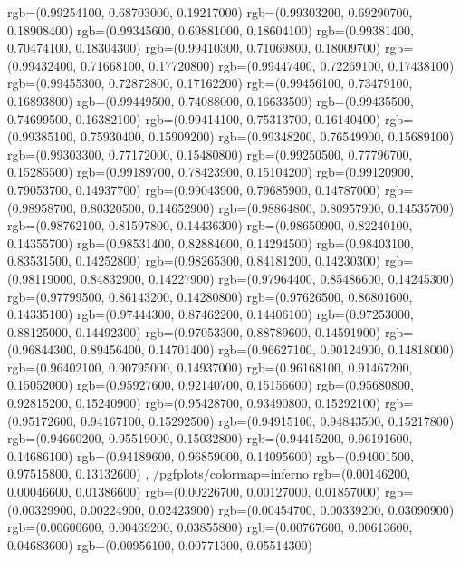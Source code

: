 {{        rgb=(0.99254100, 0.68703000, 0.19217000)
        rgb=(0.99303200, 0.69290700, 0.18908400)
        rgb=(0.99345600, 0.69881000, 0.18604100)
        rgb=(0.99381400, 0.70474100, 0.18304300)
        rgb=(0.99410300, 0.71069800, 0.18009700)
        rgb=(0.99432400, 0.71668100, 0.17720800)
        rgb=(0.99447400, 0.72269100, 0.17438100)
        rgb=(0.99455300, 0.72872800, 0.17162200)
        rgb=(0.99456100, 0.73479100, 0.16893800)
        rgb=(0.99449500, 0.74088000, 0.16633500)
        rgb=(0.99435500, 0.74699500, 0.16382100)
        rgb=(0.99414100, 0.75313700, 0.16140400)
        rgb=(0.99385100, 0.75930400, 0.15909200)
        rgb=(0.99348200, 0.76549900, 0.15689100)
        rgb=(0.99303300, 0.77172000, 0.15480800)
        rgb=(0.99250500, 0.77796700, 0.15285500)
        rgb=(0.99189700, 0.78423900, 0.15104200)
        rgb=(0.99120900, 0.79053700, 0.14937700)
        rgb=(0.99043900, 0.79685900, 0.14787000)
        rgb=(0.98958700, 0.80320500, 0.14652900)
        rgb=(0.98864800, 0.80957900, 0.14535700)
        rgb=(0.98762100, 0.81597800, 0.14436300)
        rgb=(0.98650900, 0.82240100, 0.14355700)
        rgb=(0.98531400, 0.82884600, 0.14294500)
        rgb=(0.98403100, 0.83531500, 0.14252800)
        rgb=(0.98265300, 0.84181200, 0.14230300)
        rgb=(0.98119000, 0.84832900, 0.14227900)
        rgb=(0.97964400, 0.85486600, 0.14245300)
        rgb=(0.97799500, 0.86143200, 0.14280800)
        rgb=(0.97626500, 0.86801600, 0.14335100)
        rgb=(0.97444300, 0.87462200, 0.14406100)
        rgb=(0.97253000, 0.88125000, 0.14492300)
        rgb=(0.97053300, 0.88789600, 0.14591900)
        rgb=(0.96844300, 0.89456400, 0.14701400)
        rgb=(0.96627100, 0.90124900, 0.14818000)
        rgb=(0.96402100, 0.90795000, 0.14937000)
        rgb=(0.96168100, 0.91467200, 0.15052000)
        rgb=(0.95927600, 0.92140700, 0.15156600)
        rgb=(0.95680800, 0.92815200, 0.15240900)
        rgb=(0.95428700, 0.93490800, 0.15292100)
        rgb=(0.95172600, 0.94167100, 0.15292500)
        rgb=(0.94915100, 0.94843500, 0.15217800)
        rgb=(0.94660200, 0.95519000, 0.15032800)
        rgb=(0.94415200, 0.96191600, 0.14686100)
        rgb=(0.94189600, 0.96859000, 0.14095600)
        rgb=(0.94001500, 0.97515800, 0.13132600)
    },
    /pgfplots/colormap={inferno}{
        rgb=(0.00146200, 0.00046600, 0.01386600)
        rgb=(0.00226700, 0.00127000, 0.01857000)
        rgb=(0.00329900, 0.00224900, 0.02423900)
        rgb=(0.00454700, 0.00339200, 0.03090900)
        rgb=(0.00600600, 0.00469200, 0.03855800)
        rgb=(0.00767600, 0.00613600, 0.04683600)
        rgb=(0.00956100, 0.00771300, 0.05514300)
}}
